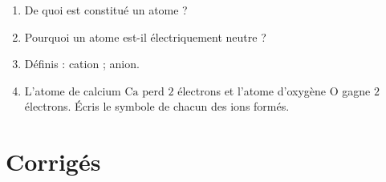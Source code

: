 \begin{enumerate}[label=\arabic*)]
\item De quoi est constitué un atome ?
\item Pourquoi un atome est-il électriquement neutre ?
\item Définis : cation ; anion.
\item L'atome de calcium $\mathrm{Ca}$ perd $2$ électrons et l'atome d'oxygène
$\mathrm{O}$ gagne $2$ électrons. Écris le symbole de chacun des ions formés.
\end{enumerate}

\section{Corrigés}
